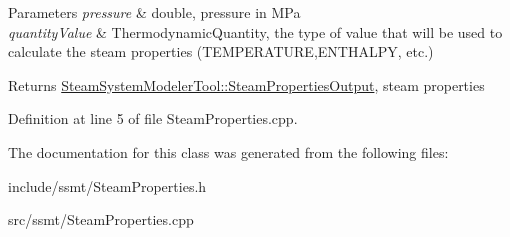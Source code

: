 \begin{DoxyParams}{Parameters}
{\em pressure} & double, pressure in M\+Pa \\
\hline
{\em quantity\+Value} & Thermodynamic\+Quantity, the type of value that will be used to calculate the steam properties (T\+E\+M\+P\+E\+R\+A\+T\+U\+RE,E\+N\+T\+H\+A\+L\+PY, etc.)\\
\hline
\end{DoxyParams}
\begin{DoxyReturn}{Returns}
\hyperlink{struct_steam_system_modeler_tool_1_1_steam_properties_output}{Steam\+System\+Modeler\+Tool\+::\+Steam\+Properties\+Output}, steam properties 
\end{DoxyReturn}


Definition at line 5 of file Steam\+Properties.\+cpp.



The documentation for this class was generated from the following files\+:\begin{DoxyCompactItemize}
\item 
include/ssmt/Steam\+Properties.\+h\item 
src/ssmt/Steam\+Properties.\+cpp\end{DoxyCompactItemize}
